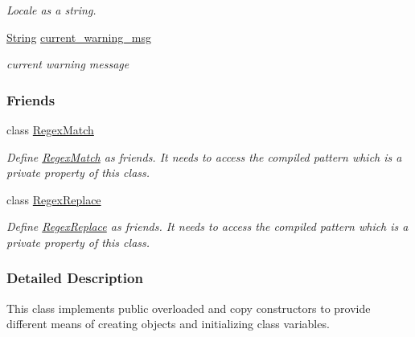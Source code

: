 \begin{DoxyCompactItemize}
\begin{DoxyCompactList}\small\item\em Locale as a string. \end{DoxyCompactList}\item 
\hyperlink{namespacejpcre2_a91f03070152fb228bc116c5a737f1d16}{String} \hyperlink{classjpcre2_1_1Regex_a1cfacd49c8bceaae1e2a66efd4082ea8}{current\+\_\+warning\+\_\+msg}\hypertarget{classjpcre2_1_1Regex_a1cfacd49c8bceaae1e2a66efd4082ea8}{}\label{classjpcre2_1_1Regex_a1cfacd49c8bceaae1e2a66efd4082ea8}

\begin{DoxyCompactList}\small\item\em current warning message \end{DoxyCompactList}\end{DoxyCompactItemize}
\subsubsection*{Friends}
\begin{DoxyCompactItemize}
\item 
class \hyperlink{classjpcre2_1_1Regex_aaa8d9b93cf5a8b9ebbb78923a1494445}{Regex\+Match}\hypertarget{classjpcre2_1_1Regex_aaa8d9b93cf5a8b9ebbb78923a1494445}{}\label{classjpcre2_1_1Regex_aaa8d9b93cf5a8b9ebbb78923a1494445}

\begin{DoxyCompactList}\small\item\em Define \hyperlink{classjpcre2_1_1RegexMatch}{Regex\+Match} as friends. It needs to access the compiled pattern which is a private property of this class. \end{DoxyCompactList}\item 
class \hyperlink{classjpcre2_1_1Regex_a2547cb5380cbe0374ac0d44d34018dbb}{Regex\+Replace}\hypertarget{classjpcre2_1_1Regex_a2547cb5380cbe0374ac0d44d34018dbb}{}\label{classjpcre2_1_1Regex_a2547cb5380cbe0374ac0d44d34018dbb}

\begin{DoxyCompactList}\small\item\em Define \hyperlink{classjpcre2_1_1RegexReplace}{Regex\+Replace} as friends. It needs to access the compiled pattern which is a private property of this class. \end{DoxyCompactList}\end{DoxyCompactItemize}


\subsubsection{Detailed Description}
This class implements public overloaded and copy constructors to provide different means of creating objects and initializing class variables. 

